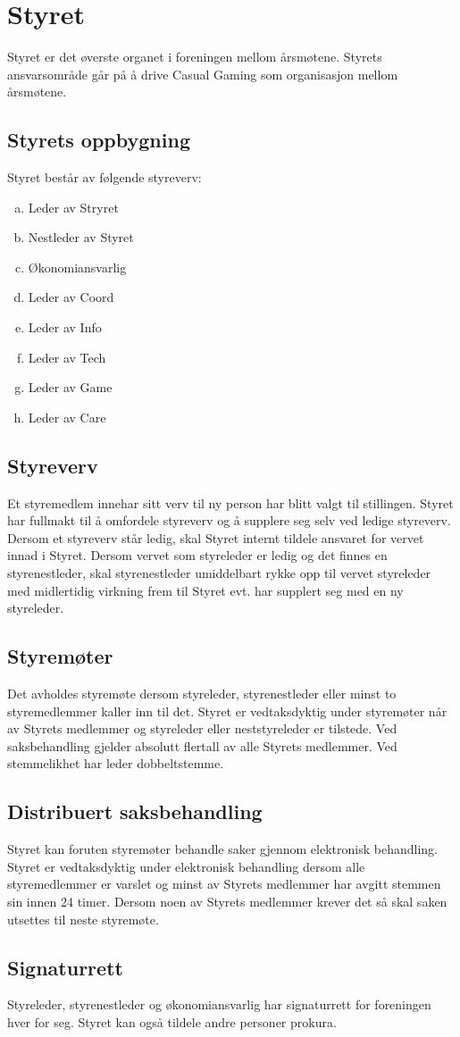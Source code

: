 \chapter{Styret}
Styret er det øverste organet i foreningen mellom årsmøtene. Styrets ansvarsområde går på å drive Casual Gaming som organisasjon mellom årsmøtene.

\section{Styrets oppbygning}
Styret består av følgende styreverv:
\begin{enumerate}[a.]
    \item Leder av Stryret
    \item Nestleder av Styret
    \item Økonomiansvarlig
    \item Leder av Coord
    \item Leder av Info
    \item Leder av Tech
    \item Leder av Game
    \item Leder av Care
\end{enumerate}

\section{Styreverv}
Et styremedlem innehar sitt verv til ny person har blitt valgt til stillingen. Styret har fullmakt til å omfordele styreverv og å supplere seg selv ved ledige styreverv. Dersom et styreverv står ledig, skal Styret internt tildele ansvaret for vervet innad i Styret. Dersom vervet som styreleder er ledig og det finnes en styrenestleder, skal styrenestleder umiddelbart rykke opp til vervet styreleder med midlertidig virkning frem til Styret evt. har supplert seg med en ny styreleder.

\section{Styremøter}
Det avholdes styremøte dersom styreleder, styrenestleder eller minst to styremedlemmer kaller inn til det. Styret er vedtaksdyktig under styremøter når  av Styrets medlemmer og styreleder eller neststyreleder er tilstede. Ved saksbehandling gjelder absolutt flertall av alle Styrets medlemmer. Ved stemmelikhet har leder dobbeltstemme.

\section{Distribuert saksbehandling}
Styret kan foruten styremøter behandle saker gjennom elektronisk behandling. Styret er vedtaksdyktig under elektronisk behandling dersom alle styremedlemmer er varslet og minst  av Styrets medlemmer har avgitt stemmen sin innen 24 timer. Dersom noen av Styrets medlemmer krever det så skal saken utsettes til neste styremøte.

\section{Signaturrett}
Styreleder, styrenestleder og økonomiansvarlig har signaturrett for foreningen hver for seg. Styret kan også tildele andre personer prokura.
